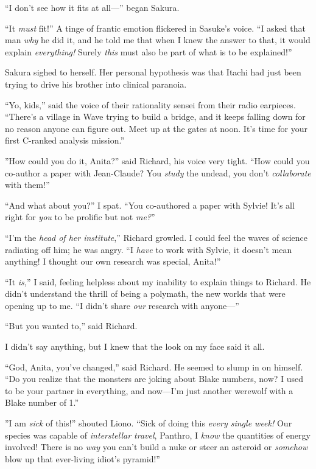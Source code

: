 “I don’t see how it fits at all—” began Sakura.

“It \emph{must} fit!” A tinge of frantic emotion flickered in Sasuke’s voice. “I asked that man \emph{why} he did it, and he told me that when I knew the answer to that, it would explain \emph{everything!} Surely \emph{this} must also be part of what is to be explained!”

Sakura sighed to herself. Her personal hypothesis was that Itachi had just been trying to drive his brother into clinical paranoia.

“Yo, kids,” said the voice of their rationality sensei from their radio earpieces. “There’s a village in Wave trying to build a bridge, and it keeps falling down for no reason anyone can figure out. Meet up at the gates at noon. It’s time for your first C-ranked analysis mission.”

\clearpage
{}
”How could you do it, Anita?” said Richard, his voice very tight. “How could you co-author a paper with Jean-Claude? You \emph{study} the undead, you don’t \emph{collaborate} with them!”

“And what about you?” I spat. “You co-authored a paper with Sylvie! It’s all right for \emph{you} to be prolific but not \emph{me?}”

“I’m the \emph{head of her institute},” Richard growled. I could feel the waves of science radiating off him; he was angry. “I \emph{have} to work with Sylvie, it doesn’t mean anything! I thought our own research was special, Anita!”

“It \emph{is,}” I said, feeling helpless about my inability to explain things to Richard. He didn’t understand the thrill of being a polymath, the new worlds that were opening up to me. “I didn’t share \emph{our} research with anyone—”

“But you wanted to,” said Richard.

I didn’t say anything, but I knew that the look on my face said it all.

“God, Anita, you’ve changed,” said Richard. He seemed to slump in on himself. “Do you realize that the monsters are joking about Blake numbers, now? I used to be your partner in everything, and now—I’m just another werewolf with a Blake number of 1.”

”I am \emph{sick} of this!” shouted Liono. “Sick of doing this \emph{every single week!} Our species was capable of \emph{interstellar travel}, Panthro, I \emph{know} the quantities of energy involved! There is no \emph{way} you can’t build a nuke or steer an asteroid or \emph{somehow} blow up that ever-living idiot’s pyramid!”

